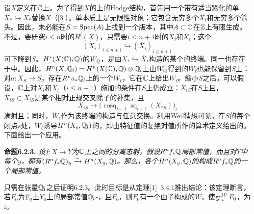 设$X$定义在$\mathbb C$上。为了得到$X$的上的Hodge结构，首先用一个带有适当紧化的单$X_*\hookrightarrow\overline X_*$替换$X$（[3]）。单本质上是无限性对象：它包含无穷多个$X_i$和无穷多个箭头。因此，未必能在$S=\operatorname{Spec}(A)$上找到一个版本，其中$A\subset\mathbb C$在$\mathbb Z$上有限生成。不过，要研究$i\le n$时的$H^i(X)$，只需要$i\le n+1$时的$X_i$和$\overline X_i$；这个
\[
(X_i)_{i\le n+1}\hookrightarrow(\overline X_i)_{i\le n+1}
\]
可下降到$S$。$H^*(X(\mathbb C),\mathbb Q)$的$W_\mathbb Q$，是由$X_*\hookrightarrow\overline X_*$构造的某个的终端。同一也存在于中。因此，$H^n(X,\mathbb Q_l)=H^n(X(\mathbb C),\mathbb Q)\otimes\mathbb Q_l$上由$W_\mathbb Q$得到的$W_\ell$也能保留到$S$上：
对$a:X_S\to S$，存在$R^na_*\mathbb Q_l$上的一个$W_\ell$，它在$\mathbb C$上给出$W_\ell$。缩小$S$之后，可以假设，$\mathbb C$上对$X_i$和$\overline X_i$（$i\le n+1$）施加的条件在$S$上仍成立：$\overline X_{iS}$在$S$上且，$X_{iS}\subset\overline X_{iS}$是某个相对正规交叉除子的补集，且
\[
X_{iS}\longrightarrow
\bigl(\operatorname{cosq}_{i-1}\operatorname{sq}_{i-1}(X_{*S})\bigr)_i
\]
满射且；同时，$W_\ell$作为该终端的构造与任意交换。利用Weil猜想可见，在$S$的每个闭点$s$处，$W_\ell$诱导$H^n(X_{\relax s},\mathbb Q_l)$的，即由特征值的复绝对值所作的算术定义给出的。下面给出一个应用。

\par\medskip\noindent\textbf{命题6.2.3.} \emph{设$f:X\to Y$为$\mathbb C$上之间的分离态射。假设$R^nf_*\mathbb Q$局部常值，而且对$Y$中每个$y$，都有$(R^nf_*\mathbb Q)_y\xrightarrow{\sim}H^n(X_y,\mathbb Q)$。那么，各个$H^n(X_y,\mathbb Q)$的构成$R^nf_*\mathbb Q$的一个局部常值。}

只需在张量$\mathbb Q_l$之后证明6.2.3。此时目标是从定理[1]~3.4.1推出结论：该定理断言，若$F_0$为$\mathbb F_q$上$Y_0$上的局部常值$\mathbb Q_l$-，且$F_0$，则$F_0$有一个由子构成的$W$，使$\operatorname{gr}_i^WF_0$，为$i$。

